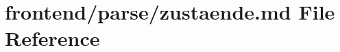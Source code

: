 \hypertarget{zustaende_8md}{\section{frontend/parse/zustaende.md File Reference}
\label{zustaende_8md}
}
